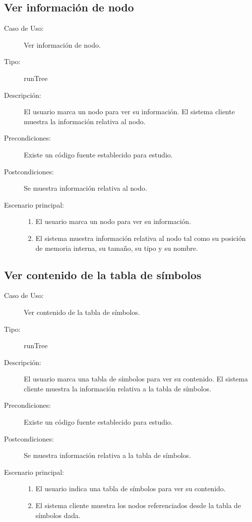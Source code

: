 \subsection{Ver información de nodo} 
\begin{framed}
\FloatBarrier
\begin{description}
   \item[Caso de Uso:] Ver información de nodo.
   \item [Tipo:] runTree
   \item[Descripción:] 
   El usuario marca un nodo para ver su información.  
   El sistema cliente muestra la información relativa al nodo.
   \item[Precondiciones:]
   Existe un código fuente establecido para estudio. 
   \item[Postcondiciones:] 
   Se muestra información relativa al nodo.
   \item[Escenario principal:] \hfill
   \begin{enumerate}
   \item El usuario marca un nodo para ver su información.
   \item El sistema muestra información relativa al nodo tal como su 
   posición de memoria interna, su tamaño, su tipo y su nombre.  
   \end{enumerate}
\end{description}
 \FloatBarrier
\end{framed}

\subsection{Ver contenido de la tabla de símbolos} 
\begin{framed}
\FloatBarrier
\begin{description}
   \item[Caso de Uso:] Ver contenido de la tabla de símbolos.
   \item [Tipo:] runTree
   \item[Descripción:] 
   El usuario marca una tabla de símbolos para ver su contenido.  
   El sistema cliente muestra la información relativa a la tabla de símbolos.
   \item[Precondiciones:]
   Existe un código fuente establecido para estudio. 
   \item[Postcondiciones:] 
   Se muestra información relativa a la tabla de símbolos.
   \item[Escenario principal:] \hfill
   \begin{enumerate}
   \item El usuario indica una tabla de símbolos para ver su contenido.
   \item El sistema cliente muestra los nodos referenciados desde la tabla de
   símbolos dada.
   \end{enumerate}
\end{description}
 \FloatBarrier
\end{framed}


